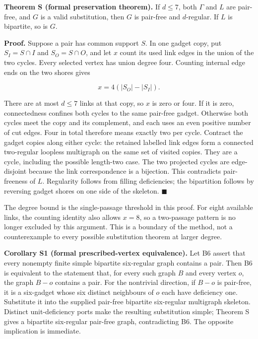 \documentclass[smallextended]{svjour3}
\newcounter{none} %
\begin{document}
\textbf{Theorem S (formal preservation theorem).} If \(d\leq7\), both
\(\Gamma\) and \(L\) are pair-free, and \(G\) is a valid substitution,
then \(G\) is pair-free and \(d\)-regular. If \(L\) is bipartite, so is
\(G\).

\textbf{Proof.} Suppose a pair has common support \(S\). In one gadget
copy, put \(S_I=S\cap I\) and \(S_O=S\cap O\), and let \(x\) count its
used link edges in the union of the two cycles. Every selected vertex
has union degree four. Counting internal edge ends on the two shores
gives

\[
x=4(|S_O|-|S_I|).
\]

There are at most \(d\leq7\) links at that copy, so \(x\) is zero or
four. If it is zero, connectedness confines both cycles to the same
pair-free gadget. Otherwise both cycles meet the copy and its
complement, and each uses an even positive number of cut edges. Four in
total therefore means exactly two per cycle. Contract the gadget copies
along either cycle: the retained labelled link edges form a connected
two-regular loopless multigraph on the same set of visited copies. They
are a cycle, including the possible length-two case. The two projected
cycles are edge-disjoint because the link correspondence is a bijection.
This contradicts pair-freeness of \(L\). Regularity follows from filling
deficiencies; the bipartition follows by reversing gadget shores on one
side of the skeleton. $\blacksquare$

The degree bound is the single-passage threshold in this proof. For
eight available links, the counting identity also allows \(x=8\), so a
two-passage pattern is no longer excluded by this argument. This is a
boundary of the method, not a counterexample to every possible
substitution theorem at larger degree.

\textbf{Corollary S1 (formal prescribed-vertex equivalence).} Let B6
assert that every nonempty finite simple bipartite six-regular graph
contains a pair. Then B6 is equivalent to the statement that, for every
such graph \(B\) and every vertex \(o\), the graph \(B-o\) contains a
pair. For the nontrivial direction, if \(B-o\) is pair-free, it is a
six-gadget whose six distinct neighbours of \(o\) each have deficiency
one. Substitute it into the supplied pair-free bipartite six-regular
multigraph skeleton. Distinct unit-deficiency ports make the resulting
substitution simple; Theorem S gives a bipartite six-regular pair-free
graph, contradicting B6. The opposite implication is immediate.
\end{document}
